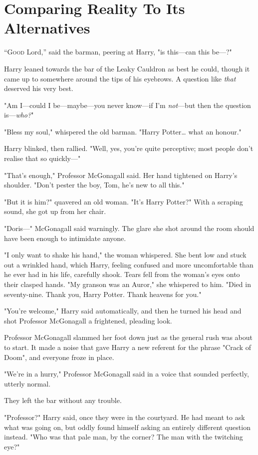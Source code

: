 \chapter{Comparing Reality To Its Alternatives}

\lettrine{“G}{ood} Lord,'' said the barman, peering at Harry, "is this---can this be---?"

Harry leaned towards the bar of the Leaky Cauldron as best he could, though it 
came up to somewhere around the tips of his eyebrows. A question like 
\emph{that} deserved his very best.

"Am I---could I be---maybe---you never know---if I'm \emph{not}---but then the 
question is---\emph{who?}"

"Bless my soul," whispered the old barman. "Harry Potter{\ldots} what an 
honour."

Harry blinked, then rallied. "Well, yes, you're quite perceptive; most people 
don't realise that so quickly---"

"That's enough," Professor McGonagall said. Her hand tightened on Harry's 
shoulder. "Don't pester the boy, Tom, he's new to all this."

"But it is him?" quavered an old woman. "It's Harry Potter?" With a scraping 
sound, she got up from her chair.

"Doris---" McGonagall said warningly. The glare she shot around the room should 
have been enough to intimidate anyone.

"I only want to shake his hand," the woman whispered. She bent low and stuck 
out a wrinkled hand, which Harry, feeling confused and more uncomfortable than 
he ever had in his life, carefully shook. Tears fell from the woman's eyes onto 
their clasped hands. "My granson was an Auror," she whispered to him. "Died in 
seventy-nine. Thank you, Harry Potter. Thank heavens for you."

"You're welcome," Harry said automatically, and then he turned his head and 
shot Professor McGonagall a frightened, pleading look.

Professor McGonagall slammed her foot down just as the general rush was about 
to start. It made a noise that gave Harry a new referent for the phrase "Crack 
of Doom", and everyone froze in place.

"We're in a hurry," Professor McGonagall said in a voice that sounded 
perfectly, utterly normal.

They left the bar without any trouble.

"Professor?" Harry said, once they were in the courtyard. He had meant to ask 
what was going on, but oddly found himself asking an entirely different 
question instead. "Who was that pale man, by the corner? The man with the 
twitching eye?"

